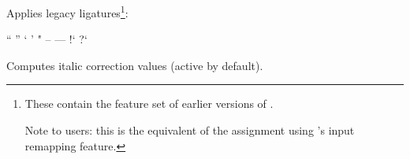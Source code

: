           Applies legacy \TEX ligatures\footnote{%
            These contain the feature set  of earlier
            versions of .

            Note to \XETEX users: this is the equivalent of the
            assignment  using \XETEX's input
            remapping feature.
          }:

          \unless \iffalse
            \begintabulate [rlrl]
              \beginrow ``  \newcell  {\inlinecode !``! } \newcell  ''  \newcell  {\inlinecode !''!} \endrow
              \beginrow `   \newcell  {\inlinecode !`!  } \newcell  '   \newcell  {\inlinecode !'! } \endrow
              \beginrow "   \newcell  {\inlinecode !"!  } \newcell  --  \newcell  {\inlinecode !--!} \endrow
              \beginrow --- \newcell  {\inlinecode !---!} \newcell  !`  \newcell  {\inlinecode ?!`?} \endrow
              \beginrow ?`  \newcell  {\inlinecode !?`! } \newcell      \newcell                     \endrow
            \endtabulate
          \else
            \startframed [frame=off,width=broad,align=middle]
              \startframed [frame=off,width=\dimexpr(\textwidth/2)]
                \startxtable [align=middle]
                    \startxrow \startxcell ``  \stopxcell \startxcell  {}  \stopxcell \startxcell  ''  \stopxcell \startxcell  {}  \stopxcell \stopxrow
                    \startxrow \startxcell `   \stopxcell \startxcell  {}   \stopxcell \startxcell  '   \stopxcell \startxcell  {}   \stopxcell \stopxrow
                    \startxrow \startxcell "   \stopxcell \startxcell  {}   \stopxcell \startxcell  --  \stopxcell \startxcell  \inlinecode {--}  \stopxcell \stopxrow
                    \startxrow \startxcell --- \stopxcell \startxcell  \inlinecode {---} \stopxcell \startxcell  !`  \stopxcell \startxcell  {}  \stopxcell \stopxrow
                    \startxrow \startxcell ?`  \stopxcell \startxcell  {}  \stopxcell \startxcell      \stopxcell \startxcell                    \stopxcell \stopxrow
                \stopxtable
              \stopframed
            \stopframed
          \fi
  \endaltitem

          Computes italic correction values (active by default).
  \endaltitem

